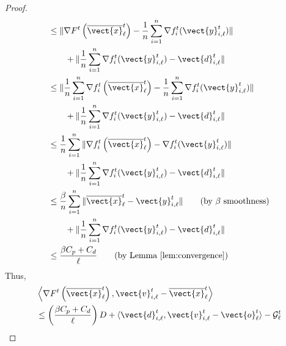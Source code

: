 \begin{proof}
\begin{align*}
        & \leq \| \nabla F^{t} \left(\overline{\vect{x}}^t_{\ell} \right) - \frac{1}{n}\sum_{i=1}^n \nabla f^t_i (\vect{y}^t_{i,\ell}) \| \\
        		& \qquad + \lVert\frac{1}{n}\sum_{i=1}^n \nabla f^t_i (\vect{y}^t_{i,\ell}) - \vect{d}^t_{i, \ell} \lVert \\
        & \leq \| \frac{1}{n}\sum_{i=1}^n \nabla f^{t}_{i} \left(\overline{\vect{x}}^t_{\ell} \right) - \frac{1}{n}\sum_{i=1}^n \nabla f^t_i (\vect{y}^t_{i,\ell}) \| \\
        		&\qquad + \lVert\frac{1}{n}\sum_{i=1}^n \nabla f^t_i (\vect{y}^t_{i,\ell}) - \vect{d}^t_{i, \ell} \lVert \\
        & \leq  \frac{1}{n}\sum_{i=1}^n \|\nabla f^{t}_{i} \left(\overline{\vect{x}}^t_{\ell} \right) -  \nabla f^t_i (\vect{y}^t_{i,\ell}) \| \\
        		 &\qquad + \lVert\frac{1}{n}\sum_{i=1}^n \nabla f^t_i (\vect{y}^t_{i,\ell}) - \vect{d}^t_{i, \ell} \lVert \\
        & \leq \frac{\beta}{n} \sum_{i=1}^n \| \overline{\vect{x}}^t_{\ell} - \vect{y}^t_{i, \ell} \| \tag{by $\beta$ smoothness} \\
        		& \qquad + \|\frac{1}{n}\sum_{i=1}^n \nabla f^t_i (\vect{y}^t_{i,\ell}) - \vect{d}^t_{i, \ell} \| \\
        & \leq \frac{\beta C_p + C_d}{\ell}  \tag{by Lemma \ref{lem:convergence}}
    \end{align*}
%
Thus,
    \begin{align*}
        & \left \langle \nabla F^{t} \left( \overline{\vect{x}}^t_{\ell} \right) , \vect{v}^t_{i,\ell} - \overline{\vect{x}}^t_{\ell} \right \rangle \\
        & \leq \left( \frac{\beta C_p + C_d}{\ell}\right)D + \langle \vect{d}^t_{i,\ell}, \vect{v}^t_{i,\ell} - \vect{o}^t_{\ell} \rangle - \mathcal{G}^t_{\ell} 
    \end{align*}



\end{proof}
